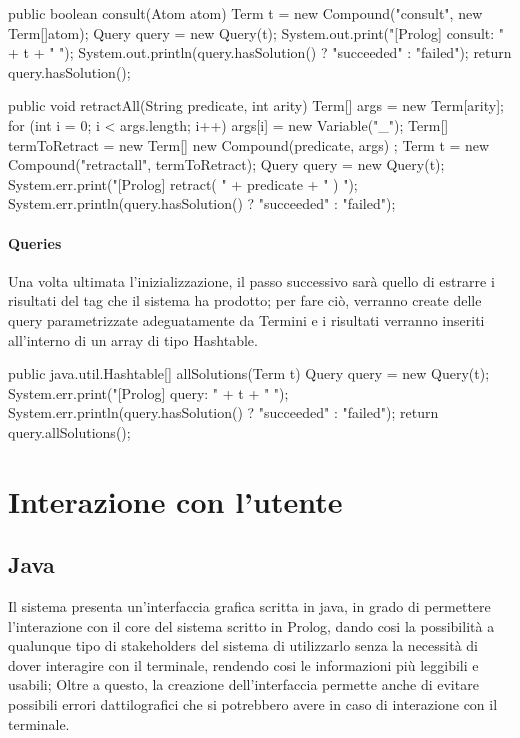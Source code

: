 \begin{javacode}
	public boolean consult(Atom atom) {
		Term t = new Compound("consult", new Term[]{atom});
		Query query = new Query(t);
		System.out.print("[Prolog] consult: " + t + " ");
		System.out.println(query.hasSolution() ? "succeeded" : "failed");
		return query.hasSolution();
	}
\end{javacode}

\begin{javacode} 
	public void retractAll(String predicate, int arity) {  
		Term[] args = new Term[arity];
		for (int i = 0; i < args.length; i++)
		args[i] = new Variable("_");
		Term[] termToRetract = new Term[]{ new Compound(predicate, args) };    
		Term t = new Compound("retractall", termToRetract);
		Query query = new Query(t);
		System.err.print("[Prolog] retract( " + predicate + " ) ");
		System.err.println(query.hasSolution() ? "succeeded" : "failed");
	}
\end{javacode}

\paragraph{Queries}
Una volta ultimata l'inizializzazione, il passo successivo sarà quello di estrarre i risultati del tag che il sistema ha prodotto; per fare ciò, verranno create delle query parametrizzate adeguatamente da Termini e i risultati verranno inseriti all'interno di un array di tipo Hashtable.

\begin{javacode}
	public java.util.Hashtable[] allSolutions(Term t) {
		Query query = new Query(t);
		System.err.print("[Prolog] query: " + t + " ");
		System.err.println(query.hasSolution() ? "succeeded" : "failed");
		return query.allSolutions();
	}
\end{javacode}

\section{Interazione con l'utente}
\subsection{Java}
Il sistema presenta un'interfaccia grafica scritta in java, in grado di permettere l'interazione con il core del sistema scritto in Prolog, dando cosi la possibilità a qualunque tipo di stakeholders del sistema di utilizzarlo senza la necessità di dover interagire con il terminale, rendendo cosi le informazioni più leggibili e usabili; Oltre a questo, la creazione dell'interfaccia permette anche di evitare possibili errori dattilografici che si potrebbero avere in caso di interazione con il terminale.

